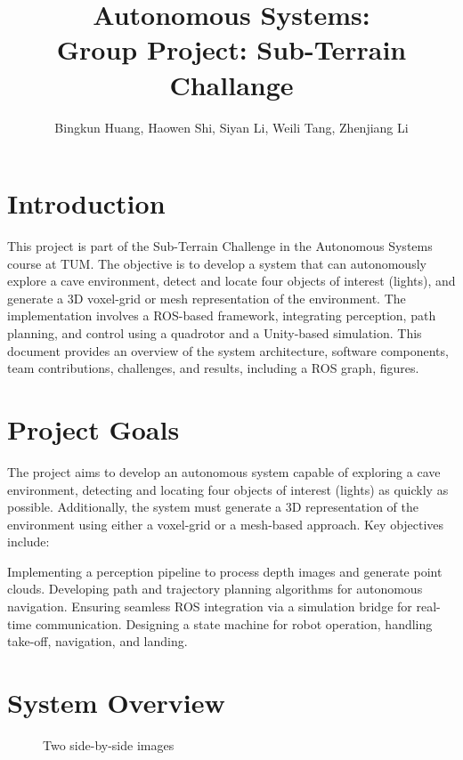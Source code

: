 \documentclass{article}
\title{Autonomous Systems: \\ Group Project: Sub-Terrain Challange}
\author{Bingkun Huang, Haowen Shi, Siyan Li, Weili Tang, Zhenjiang Li}
\date{}
\begin{document}
\maketitle
\pagestyle{fancy}

\section{Introduction}
This project is part of the Sub-Terrain Challenge in the Autonomous Systems course at TUM.
The objective is to develop a system that can autonomously explore a cave environment, detect and locate four objects of interest (lights), and generate a 3D voxel-grid or mesh representation of the environment.
The implementation involves a ROS-based framework, integrating perception, path planning, and control using a quadrotor and a Unity-based simulation.
This document provides an overview of the system architecture, software components, team contributions, challenges, and results, including a ROS graph, figures.

\section{Project Goals}
The project aims to develop an autonomous system capable of exploring a cave environment, detecting and locating four objects of interest (lights) as quickly as possible. Additionally, the system must generate a 3D representation of the environment using either a voxel-grid or a mesh-based approach. Key objectives include:

Implementing a perception pipeline to process depth images and generate point clouds.
Developing path and trajectory planning algorithms for autonomous navigation.
Ensuring seamless ROS integration via a simulation bridge for real-time communication.
Designing a state machine for robot operation, handling take-off, navigation, and landing.


\section{System Overview}

\begin{figure}[h]
    \centering
    \caption{Two side-by-side images}
    \label{fig:two_images}
\end{figure}
\end{document}
